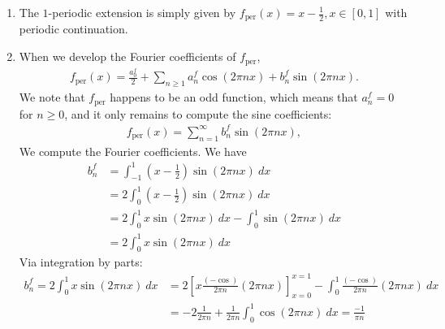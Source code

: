 \documentclass[11pt]{article}
\begin{document}
\begin{solution}
    \begin{enumerate}
        \item The $1$-periodic extension is simply given by $f_{\text{per}}(x) = x - \frac 1 2, x \in [0, 1]$ with periodic continuation.
        \item When we develop the Fourier coefficients of $f_{\text{per}}$, 
        \begin{align*}
            f_{\text{per}}(x) = \frac{a^{f}_0}{2} + \sum_{n \geq 1} a^{f}_{n} \cos( 2 \pi n x ) + b^{f}_{n} \sin( 2 \pi n x ).
        \end{align*}
        We note that $f_{\text{per}}$ happens to be an odd function, which means that $a^{f}_n = 0$ for $n \geq 0$,
        and it only remains to compute the sine coefficients:
        \begin{align*}
            f_{\text{per}}(x) = \sum_{n=1}^{\infty} b^{f}_n \sin(2 \pi n x),
        \end{align*}
        We compute the Fourier coefficients. We have 
        \begin{align*}
            b^{f}_n 
            &= 
            \int_{-1}^{1} \left( x- \frac 1 2 \right) \sin(2 \pi n x) \ dx 
            \\&= 
            2 
            \int_{ 0}^{1} \left( x- \frac 1 2 \right) \sin(2 \pi n x) \ dx 
            \\&= 
            2 
            \int_{ 0}^{1} x \sin(2 \pi n x) \ dx 
            - 
            \int_{ 0}^{1} \sin(2 \pi n x) \ dx 
            \\&= 
            2 
            \int_{ 0}^{1} x \sin(2 \pi n x) \ dx 
        \end{align*}
        Via integration by parts:
        \begin{align*}
            b^{f}_{n}
            = 
            2 
            \int_{ 0}^{1} x \sin(2 \pi n x) \ dx 
            &
            =
            2 
            \left[ x \frac{(-\cos)}{2\pi n}(2 \pi n x) \right]_{x=0}^{x=1}
            -
            \int_{0}^{1} \frac{(-\cos)}{2\pi n}(2 \pi n x) \ dx 
            \\&= 
            -
            2 
            \frac{1}{2\pi n}
            + 
            \frac{1}{2\pi n}
            \int_{0}^{1} \cos(2 \pi n x) \ dx 
            =
            \frac{-1}{\pi n}

\end{align*}
\end{enumerate}
\end{solution}
\end{document}
